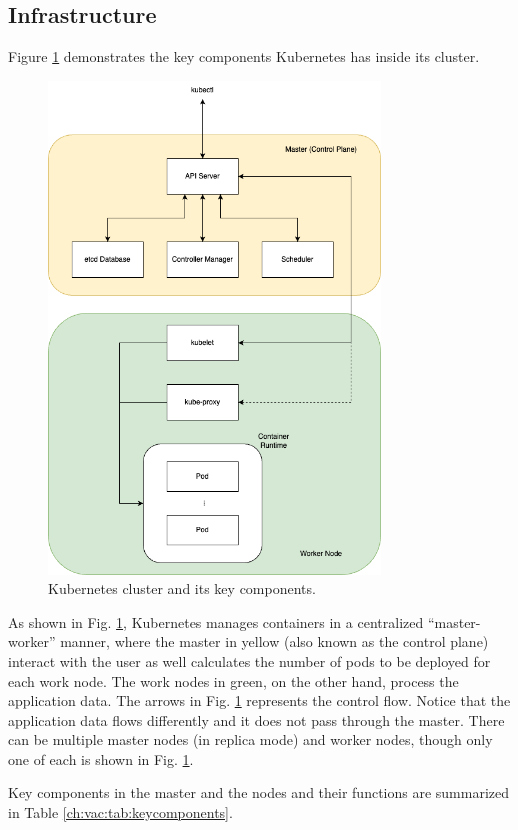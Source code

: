 \subsection{Infrastructure}

Figure \ref{ch:vac:fig:kubernetescluster} demonstrates the key components Kubernetes has inside its cluster.
\begin{figure}[!htb]
	\centering
	\includegraphics[width=250pt]{chapters/part-3/figures/k8sarchitecture.png}
	\caption{Kubernetes cluster and its key components.} \label{ch:vac:fig:kubernetescluster}
\end{figure}
As shown in Fig. \ref{ch:vac:fig:kubernetescluster}, Kubernetes manages containers in a centralized ``master-worker'' manner, where the master in yellow (also known as the control plane) interact with the user as well calculates the number of pods to be deployed for each work node. The work nodes in green, on the other hand, process the application data. The arrows in Fig. \ref{ch:vac:fig:kubernetescluster} represents the control flow. Notice that the application data flows differently and it does not pass through the master. There can be multiple master nodes (in replica mode) and worker nodes, though only one of each is shown in Fig. \ref{ch:vac:fig:kubernetescluster}.

Key components in the master and the nodes and their functions are summarized in Table \ref{ch:vac:tab:keycomponents}.

